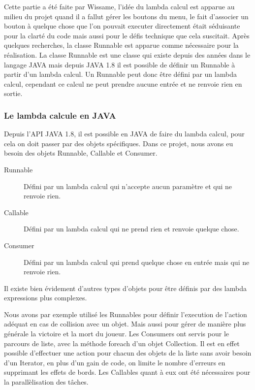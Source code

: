 Cette partie a été faite par Wissame, l'idée du lambda calcul est apparue au milieu du projet quand il a fallut gérer les boutons du menu, le fait d'associer un bouton à quelque chose que l'on pouvait executer directement était séduisante pour la clarté du code mais aussi pour le défis technique que cela suscitait. Après quelques recherches, la classe Runnable est apparue comme nécessaire pour la réalisation.
\ml
La classe Runnable est une classe qui existe depuis des années dans le langage JAVA mais depuis JAVA 1.8 il est possible de définir un Runnable à partir d'un lambda calcul. 
\ml
Un Runnable peut donc être défini par un lambda calcul, cependant ce calcul ne peut prendre aucune entrée et ne renvoie rien en sortie. 

\subsubsection{Le lambda calcule en JAVA}

Depuis l'API JAVA 1.8, il est possible en JAVA de faire du lambda calcul, pour cela on doit passer par des objets spécifiques. Dans ce projet, nous avons eu besoin des objets Runnable, Callable et Consumer.

\begin{description}
\item[Runnable] Défini par un lambda calcul qui n'accepte aucun paramètre et qui ne renvoie rien.
\item[Callable] Défini par un lambda calcul qui ne prend rien et renvoie quelque chose.
\item[Consumer] Défini par un lambda calcul qui prend quelque chose en entrée mais qui ne renvoie rien.
\end{description}

Il existe bien évidement d'autres types d'objets pour être définis par des lambda expressions plus complexes.

Nous avons par exemple utilisé les Runnables pour définir l'execution de l'action adéquat en cas de collision avec un objet. Mais aussi pour gérer de manière plus générale la victoire et la mort du joueur.
\ml
Les Consumers ont servis pour le parcours de liste, avec la méthode foreach d'un objet Collection. Il est en effet possible d'effectuer une action pour chacun des objets de la liste sans avoir besoin d'un Iterator, en plus d'un gain de code, on limite le nombre d'erreurs en supprimant les effets de bords.
\ml
Les Callables quant à eux ont été nécessaires pour la parallèlisation des tâches.

